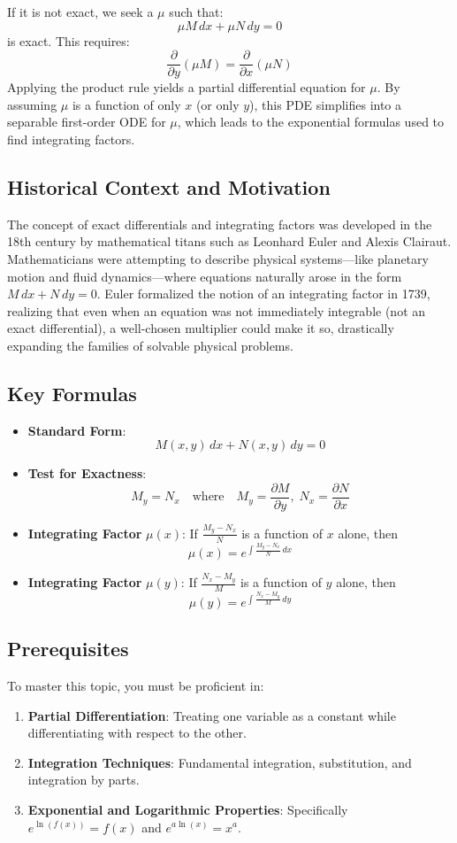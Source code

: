 \documentclass[11pt]{article}
\begin{document}
If it is not exact, we seek a $\mu$ such that:
\[ \mu M \, dx + \mu N \, dy = 0 \]
is exact. This requires:
\[ \frac{\partial}{\partial y}(\mu M) = \frac{\partial}{\partial x}(\mu N) \]
Applying the product rule yields a partial differential equation for $\mu$. By assuming $\mu$ is a function of only $x$ (or only $y$), this PDE simplifies into a separable first-order ODE for $\mu$, which leads to the exponential formulas used to find integrating factors.

\subsection{Historical Context and Motivation}
The concept of exact differentials and integrating factors was developed in the 18th century by mathematical titans such as Leonhard Euler and Alexis Clairaut. Mathematicians were attempting to describe physical systems—like planetary motion and fluid dynamics—where equations naturally arose in the form $M \, dx + N \, dy = 0$. Euler formalized the notion of an integrating factor in 1739, realizing that even when an equation was not immediately integrable (not an exact differential), a well-chosen multiplier could make it so, drastically expanding the families of solvable physical problems.

\subsection{Key Formulas}
\begin{itemize}
    \item \textbf{Standard Form}: \[ M(x, y) \, dx + N(x, y) \, dy = 0 \]
    \item \textbf{Test for Exactness}: \[ M_y = N_x \quad \text{where} \quad M_y = \frac{\partial M}{\partial y}, \; N_x = \frac{\partial N}{\partial x} \]
    \item \textbf{Integrating Factor } $\mu(x)$: If $\frac{M_y - N_x}{N}$ is a function of $x$ alone, then \[ \mu(x) = e^{\int \frac{M_y - N_x}{N} \, dx} \]
    \item \textbf{Integrating Factor } $\mu(y)$: If $\frac{N_x - M_y}{M}$ is a function of $y$ alone, then \[ \mu(y) = e^{\int \frac{N_x - M_y}{M} \, dy} \]
\end{itemize}

\subsection{Prerequisites}
To master this topic, you must be proficient in:
\begin{enumerate}
    \item \textbf{Partial Differentiation}: Treating one variable as a constant while differentiating with respect to the other.
    \item \textbf{Integration Techniques}: Fundamental integration, substitution, and integration by parts.
    \item \textbf{Exponential and Logarithmic Properties}: Specifically $e^{\ln(f(x))} = f(x)$ and $e^{a \ln(x)} = x^a$.
\end{enumerate}
\end{document}
